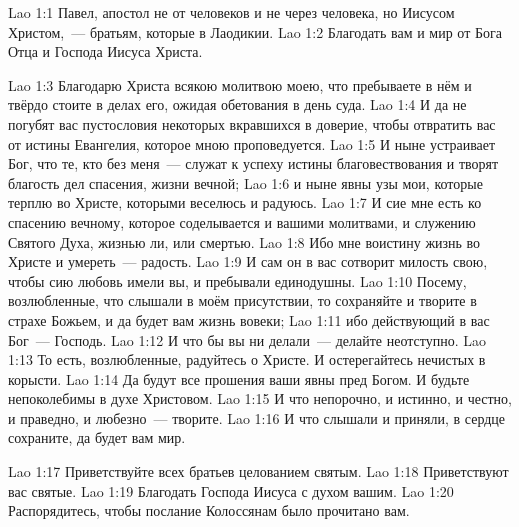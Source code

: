 \vs Lao 1:1
Павел, апостол не от человеков и не через человека,
но Иисусом Христом,~--- братьям, которые в Лаодикии.
\vs Lao 1:2
Благодать вам и мир от Бога Отца и Господа Иисуса Христа.

\vs Lao 1:3
Благодарю Христа всякою молитвою моею,
что пребываете в нём и твёрдо стоите в делах его,
ожидая обетования в день суда.
\vs Lao 1:4
И да не погубят вас пустословия некоторых
вкравшихся в доверие, чтобы отвратить вас
от истины Евангелия, которое мною проповедуется.
\vs Lao 1:5
И ныне устраивает Бог, что те, кто без меня~--- служат
к успеху истины благовествования и творят благость
дел спасения, жизни вечной;
\vs Lao 1:6
и ныне явны узы мои, которые терплю во Христе,
которыми веселюсь и радуюсь.
\vs Lao 1:7
И сие мне есть ко спасению вечному,
которое соделывается и вашими молитвами,
и служению Святого Духа, жизнью ли, или смертью.
\vs Lao 1:8
Ибо мне воистину жизнь во Христе и умереть~--- радость.
\vs Lao 1:9
И сам он в вас сотворит милость свою,
чтобы сию любовь имели вы, и пребывали единодушны.
\vs Lao 1:10
Посему, возлюбленные, что слышали в моём присутствии,
то сохраняйте и творите в страхе Божьем,
и да будет вам жизнь вовеки;
\vs Lao 1:11
ибо действующий в вас Бог~--- Господь.
\vs Lao 1:12
И что бы вы ни делали~--- делайте неотступно.
\vs Lao 1:13
То есть, возлюбленные, радуйтесь о Христе.
И остерегайтесь нечистых в корысти.
\vs Lao 1:14
Да будут все прошения ваши явны пред Богом.
И будьте непоколебимы в духе Христовом.
\vs Lao 1:15
И что непорочно, и истинно, и честно, и праведно,
и любезно~--- творите.
\vs Lao 1:16
И что слышали и приняли,
в сердце сохраните, да будет вам мир.

\vs Lao 1:17
Приветствуйте всех братьев целованием святым.
\vs Lao 1:18
Приветствуют вас святые.
\vs Lao 1:19
Благодать Господа Иисуса с духом вашим.
\vs Lao 1:20
Распорядитесь, чтобы послание Колоссянам было прочитано вам.
